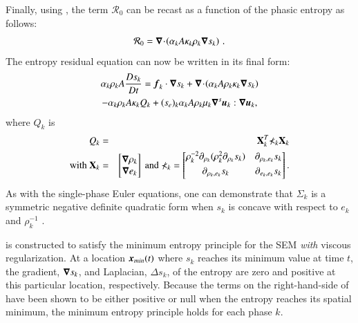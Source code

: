 \documentclass[preprint,10pt]{elsarticle}
\begin{document}
Finally, using , the term $\mathcal{R}_0$ can be recast as a function of the phasic entropy as follows: 
%
\begin{equation}
\mathcal{R}_0 = \boldsymbol\nabla\! \cdot \! \left( \alpha_k A \kappa_k \rho_k \boldsymbol\nabla s_k \right) \,.
\end{equation}
%
The entropy residual equation can now be written in its final form:
%
\begin{multline}\label{eq:ent-res-7-eqn-diss-terms3}
\alpha_k \rho_k A \frac{Ds_k}{Dt} =  \boldsymbol f_k \cdot \boldsymbol\nabla s_k + \boldsymbol\nabla\! \cdot \! \left( \alpha_k A \rho_k \kappa_k  \boldsymbol\nabla s_k \right)  \\
- \alpha_k \rho_k A \kappa_k Q_k + (s_e)_k \alpha_k A \rho_k \mu_k \boldsymbol\nabla^s \boldsymbol u_k : \boldsymbol\nabla \boldsymbol u_k,
\end{multline}
%
where $Q_k$ is 
%
\begin{eqnarray}
Q_k &=& \mathbf{X}^T_k \mathbb{\Sigma}_k \mathbf{X}_k \nonumber \\
\text{with } \mathbf{X}_k &=& \begin{bmatrix}
\boldsymbol\nabla \rho_k \\
\boldsymbol\nabla e_k 
\end{bmatrix}
\text{ and } \mathbb{\Sigma}_k = \begin{bmatrix}
       \rho_k^{-2} \partial_{\rho_k} (\rho^2_k \partial_{\rho_k} s_k) & \partial_{\rho_k,e_k} s_k  \\[0.3em]
       \partial_{\rho_k,e_k} s_k & \partial_{e_k,e_k} s_k           \\[0.3em]
     \end{bmatrix}. \nonumber 
\end{eqnarray}
%
As with the single-phase Euler equations, one can demonstrate that $\mathbb{\Sigma}_k$ is a symmetric negative definite quadratic form 
when $s_k$ is concave with respect to $e_k$ and $\rho_k^{-1}$  \cite{jlg, Marco_paper_low_mach}.

 is constructed to satisfy the minimum entropy principle for the SEM \emph{with} viscous regularization. 
At a location $\boldsymbol x_{min}(t)$ where $s_k$ reaches its minimum value at time $t$, the gradient, $\boldsymbol\nabla s_k$, and Laplacian, $\Delta s_k$, 
of the entropy are zero and positive at this particular location, respectively. %
Because the terms on the right-hand-side of  have been shown to be either positive or null when 
the entropy reaches its spatial minimum, the minimum entropy principle holds for each phase $k$.
\end{document}
